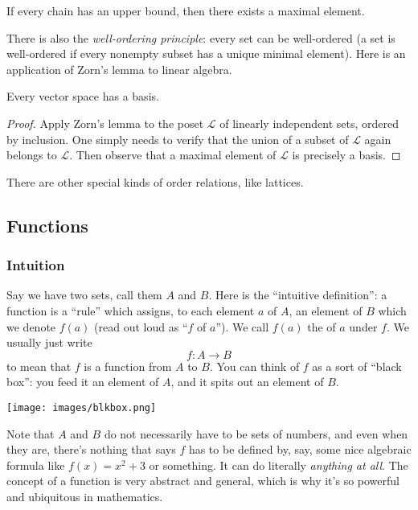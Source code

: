 \begin{lemma}
If every chain has an upper bound, then there exists a maximal element.
\end{lemma}

There is also the \emph{well-ordering principle}: every set can be well-ordered (a set is well-ordered if every nonempty subset has a unique minimal element). Here is an application of Zorn's lemma to linear algebra.

\begin{theorem}
Every vector space has a basis.
\end{theorem}

\begin{proof}
Apply Zorn's lemma to the poset $\mathcal{L}$ of linearly independent sets, ordered by inclusion. One simply needs to verify that the union of a subset of $\mathcal{L}$ again belongs to $\mathcal{L}$. Then observe that a maximal element of $\mathcal{L}$ is precisely a basis.
\end{proof}

\begin{remark}
There are other special kinds of order relations, like lattices.
\end{remark}

\subsection{Functions}


\subsubsection{Intuition}

Say we have two sets, call them $A$ and $B$. Here is the ``intuitive definition'': a function is a ``rule'' which assigns, to each element $a$ of $A$, an element of $B$ which we denote $f(a)$ (read out loud as ``$f$ of $a$''). We call $f(a)$ the  of $a$ under $f$. We usually just write 
\[ f : A \to B \]
to mean that $f$ is a function from $A$ to $B$. You can think of $f$ as a sort of ``black box'': you feed it an element of $A$, and it spits out an element of $B$.

\begin{center}
\texttt{[image: images/blkbox.png]}
\end{center}

\begin{remark}
Note that $A$ and $B$ do not necessarily have to be sets of numbers, and even when they are, there's nothing that says $f$ has to be defined by, say, some nice algebraic formula like $f(x) = x^2 + 3$ or something. It can do literally \emph{anything at all}. The concept of a function is very abstract and general, which is why it's so powerful and ubiquitous in mathematics.
\end{remark}

